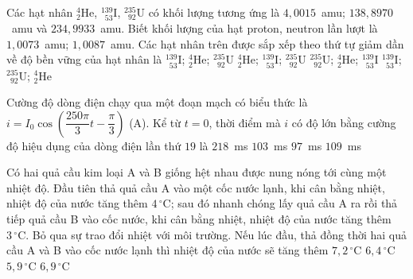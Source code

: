 	\begin{ex}%
		Các hạt nhân ${}^{4}_{2}\text{He}$, ${}^{139}_{\phantom{1}53}\text{I}$, ${}^{235}_{\phantom{2}92}\text{U}$ có khối lượng tương ứng là $4{,}0015$~amu; $138{,}8970$~amu và $234{,}9933$~amu. Biết khối lượng của hạt proton, neutron lần lượt là $1{,}0073$~amu; $1{,}0087$~amu. Các hạt nhân trên được sắp xếp theo thứ tự giảm dần về độ bền vững của hạt nhân là
		\choice
		{${}^{139}_{\phantom{1}53}\text{I}$; ${}^{4}_{2}\text{He}$; ${}^{235}_{\phantom{2}92}\text{U}$}
		{${}^{4}_{2}\text{He}$; ${}^{139}_{\phantom{1}53}\text{I}$; ${}^{235}_{\phantom{2}92}\text{U}$}
		{${}^{235}_{\phantom{2}92}\text{U}$; ${}^{4}_{2}\text{He}$; ${}^{139}_{\phantom{1}53}\text{I}$}
		{\True ${}^{139}_{\phantom{1}53}\text{I}$; ${}^{235}_{\phantom{2}92}\text{U}$; ${}^{4}_{2}\text{He}$}
	\end{ex}

	\begin{ex}%
		Cường độ dòng điện chạy qua một đoạn mạch có biểu thức là $i=I_0\cos\left(\dfrac{250\pi}{3}t-\dfrac{\pi}{3}\right)$ (A). Kể từ $t=0$, thời điểm mà $i$ có độ lớn bằng cường độ hiệu dụng của dòng điện lần thứ $19$ là
		\choice
		{$218$~ms}
		{$103$~ms}
		{$97$~ms}
		{\True $109$~ms}
	\end{ex}

	\begin{ex}%
		Có hai quả cầu kim loại A và B giống hệt nhau được nung nóng tới cùng một nhiệt độ. Đầu tiên thả quả cầu A vào một cốc nước lạnh, khi cân bằng nhiệt, nhiệt độ của nước tăng thêm $4\,^\circ\text{C}$; sau đó nhanh chóng lấy quả cầu A ra rồi thả tiếp quả cầu B vào cốc nước, khi cân bằng nhiệt, nhiệt độ của nước tăng thêm $3\,^\circ\text{C}$. Bỏ qua sự trao đổi nhiệt với môi trường. Nếu lúc đầu, thả đồng thời hai quả cầu A và B vào cốc nước lạnh thì nhiệt độ của nước sẽ tăng thêm
		\choice
		{$7{,}2\,^\circ\text{C}$}
		{\True $6{,}4\,^\circ\text{C}$}
		{$5{,}9\,^\circ\text{C}$}
		{$6{,}9\,^\circ\text{C}$}
	\end{ex}

